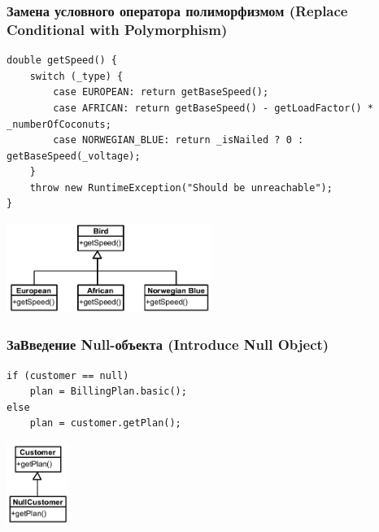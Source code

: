 \documentclass{../../slides-style}
\begin{document}
    \begin{frame}[fragile]
        \frametitle{Замена условного оператора полиморфизмом (Replace Conditional with Polymorphism)}
        \begin{footnotesize}
            \begin{verbatim}
double getSpeed() {
    switch (_type) {
        case EUROPEAN: return getBaseSpeed();
        case AFRICAN: return getBaseSpeed() - getLoadFactor() * _numberOfCoconuts;
        case NORWEGIAN_BLUE: return _isNailed ? 0 : getBaseSpeed(_voltage);
    }
    throw new RuntimeException("Should be unreachable");
}
            \end{verbatim}
        \end{footnotesize}
        
        \hspace{2cm}{\Huge{$\Downarrow$}}
        
        \begin{center}
            \includegraphics[width=0.5\textwidth]{replaceConditionalWithPolymorphism.png}
        \end{center}
    \end{frame}

    \begin{frame}[fragile]
        \frametitle{ЗаВведение Null-объекта (Introduce Null Object)}
        \begin{verbatim}
if (customer == null)
    plan = BillingPlan.basic();
else
    plan = customer.getPlan();
        \end{verbatim}
        
        \hspace{2cm}{\Huge{$\Downarrow$}}
        
        \begin{center}
            \includegraphics[width=0.15\textwidth]{nullObject.png}
        \end{center}
    \end{frame}
\end{document}
